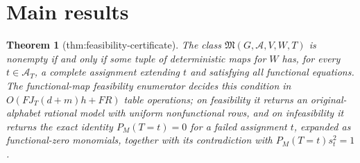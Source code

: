 \documentclass{article}
\newtheorem{theorem}{Theorem}
\begin{document}
\section{Main results}

\begin{theorem}[thm:feasibility-certificate]\label{thm:feasibility-certificate}
The class \(\mathfrak M(G,\mathcal A,V,W,T)\) is nonempty if and only if some tuple of deterministic maps for \(W\) has, for every \(t\in\mathcal A_T\), a complete assignment extending \(t\) and satisfying all functional equations. The functional-map feasibility enumerator decides this condition in \(O(FJ_T(d+m)h+FR)\) table operations; on feasibility it returns an original-alphabet rational model with uniform nonfunctional rows, and on infeasibility it returns the exact identity \(P_M(T=t)=0\) for a failed assignment \(t\), expanded as functional-zero monomials, together with its contradiction with \(P_M(T=t)s_t^2=1\).
\end{theorem}
\end{document}
